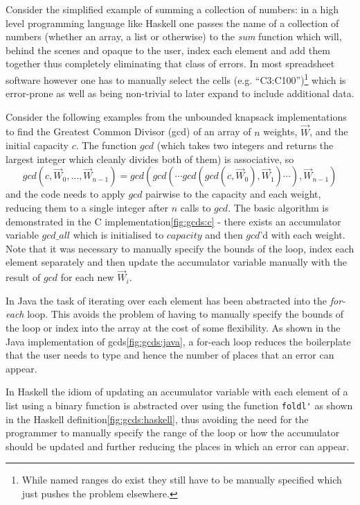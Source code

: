 \documentclass[smallextended]{svjour3}       %
\begin{document}
Consider the simplified example of summing a collection of numbers: in a high level programming language like Haskell one passes the name of a collection of numbers (whether an array, a list or otherwise) to the \emph{sum} function which will, behind the scenes and opaque to the user, index each element and add them together thus completely eliminating that class of errors. In most spreadsheet software however one has to manually select the cells (e.g. ``C3:C100'')\footnote{While named ranges do exist they still have to be manually specified which just pushes the problem elsewhere.} which is error-prone as well as being non-trivial to later expand to include additional data.

Consider the following examples from the unbounded knapsack implementations to find the Greatest Common Divisor (gcd) of an array of $n$ weights, $\vec{W}$, and the initial capacity $c$. The function $gcd$ (which takes two integers and returns the largest integer which cleanly divides both of them) is associative, so $$ gcd (c, \vec{W}_0, \ldots, \vec{W}_{n-1}) =  gcd(gcd(\cdots gcd(gcd(c,\vec{W}_0),\vec{W}_1)\cdots),\vec{W}_{n-1}) $$ and the code needs to apply $gcd$ pairwise to the capacity and each weight, reducing them to a single integer after $n$ calls to $gcd$. The basic algorithm is demonstrated in the C implementation\ref{fig:gcds:c} - there exists an accumulator variable $gcd\_all$ which is initialised to $capacity$ and then $gcd$'d with each weight. Note that it was necessary to manually specify the bounds of the loop, index each element separately and then update the accumulator variable manually with the result of $gcd$ for each new $\vec{W}_i$.

In Java the task of iterating over each element has been abstracted into the \emph{for-each} loop. This avoids the problem of having to manually specify the bounds of the loop or index into the array at the cost of some flexibility. As shown in the Java implementation of gcds\ref{fig:gcds:java}, a for-each loop reduces the boilerplate that the user needs to type and hence the number of places that an error can appear.

In Haskell the idiom of updating an accumulator variable with each element of a list using a binary function is abstracted over using the function \lstinline|foldl'| as shown in the Haskell definition\ref{fig:gcds:haskell}, thus avoiding the need for the programmer to manually specify the range of the loop or how the accumulator should be updated and further reducing the places in which an error can appear.
\end{document}
